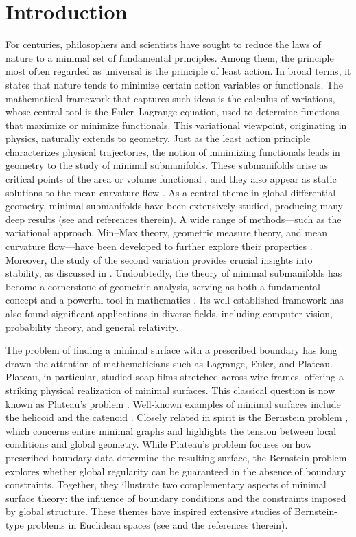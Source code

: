 \documentclass[reqno,11pt, letterpaper]{amsart}
\theoremstyle{plain}
\theoremstyle{definition}
\numberwithin{equation}{section}
\begin{document}
\section{Introduction}
For centuries, philosophers and scientists have sought to reduce the laws of nature to a minimal set of fundamental principles. Among them, the principle most often regarded as universal is the principle of least action. In broad terms, it states that nature tends to minimize certain action variables or functionals. The mathematical framework that captures such ideas is the calculus of variations, whose central tool is the Euler–Lagrange equation, used to determine functions that maximize or minimize functionals.
This variational viewpoint, originating in physics, naturally extends to geometry. Just as the least action principle characterizes physical trajectories, the notion of minimizing functionals leads in geometry to the study of minimal submanifolds. These submanifolds arise as critical points of the area or volume functional \cite{bla0, bla1, cm}, and they also appear as static solutions to the mean curvature flow \cite{hui-84, zhu}. As a central theme in global differential geometry, minimal submanifolds have been extensively studied, producing many deep results (see \cite{bre12, bre131, bre21, bre} and references therein). A wide range of methods—such as the variational approach, Min–Max theory, geometric measure theory, and mean curvature flow—have been developed to further explore their properties \cite{mn14, mn16, mn17}.
Moreover, the study of the second variation provides crucial insights into stability, as discussed in \cite{cl0, cl}. Undoubtedly, the theory of minimal submanifolds has become a cornerstone of geometric analysis, serving as both a fundamental concept and a powerful tool in mathematics \cite{bre13}. Its well-established framework has also found significant applications in diverse fields, including computer vision, probability theory, and general relativity.

The problem of finding a minimal surface with a prescribed boundary has long drawn the attention of mathematicians such as Lagrange, Euler, and Plateau. Plateau, in particular, studied soap films stretched across wire frames, offering a striking physical realization of minimal surfaces. This classical question is now known as Plateau’s problem \cite{cour, dou, rad}. Well-known examples of minimal surfaces include the helicoid and the catenoid \cite{cm0}.
Closely related in spirit is the Bernstein problem \cite{alm, bgg}, which concerns entire minimal graphs and highlights the tension between local conditions and global geometry. While Plateau’s problem focuses on how prescribed boundary data determine the resulting surface, the Bernstein problem explores whether global regularity can be guaranteed in the absence of boundary constraints. Together, they illustrate two complementary aspects of minimal surface theory: the influence of boundary conditions and the constraints imposed by global structure. These themes have inspired extensive studies of Bernstein-type problems in Euclidean spaces (see \cite{fs, ssy, sol} and the references therein).
\end{document}
